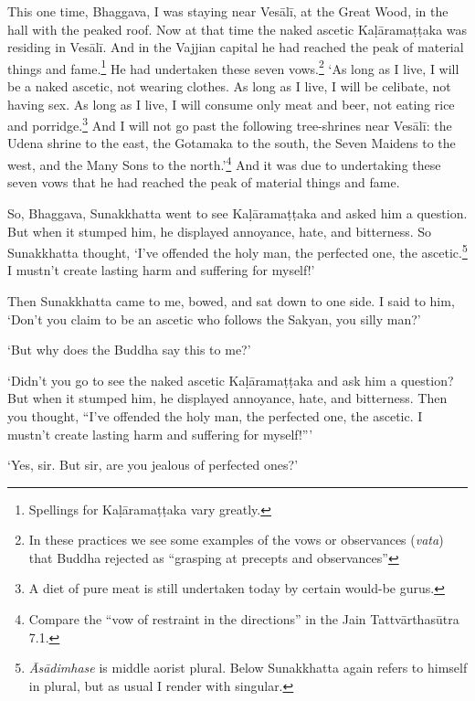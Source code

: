 \documentclass[12pt,openany]{book}%
\begin{document}
This one time, Bhaggava, I was staying near \textsanskrit{Vesālī}, at the Great Wood, in the hall with the peaked roof. Now at that time the naked ascetic \textsanskrit{Kaḷāramaṭṭaka} was residing in \textsanskrit{Vesālī}. And in the Vajjian capital he had reached the peak of material things and fame.\footnote{Spellings for \textsanskrit{Kaḷāramaṭṭaka} vary greatly. } He had undertaken these seven vows.\footnote{In these practices we see some examples of the vows or observances (\textit{vata}) that Buddha rejected as “grasping at precepts and observances” } ‘As long as I live, I will be a naked ascetic, not wearing clothes. As long as I live, I will be celibate, not having sex. As long as I live, I will consume only meat and beer, not eating rice and porridge.\footnote{A diet of pure meat is still undertaken today by certain would-be gurus. } And I will not go past the following tree-shrines near \textsanskrit{Vesālī}: the Udena shrine to the east, the Gotamaka to the south, the Seven Maidens to the west, and the Many Sons to the north.’\footnote{Compare the “vow of restraint in the directions” in the Jain \textsanskrit{Tattvārthasūtra} 7.1. } And it was due to undertaking these seven vows that he had reached the peak of material things and fame. 

So, Bhaggava, Sunakkhatta went to see \textsanskrit{Kaḷāramaṭṭaka} and asked him a question. But when it stumped him, he displayed annoyance, hate, and bitterness. So Sunakkhatta thought, ‘I’ve offended the holy man, the perfected one, the ascetic.\footnote{\textit{\textsanskrit{Āsādimhase}} is middle aorist plural. Below Sunakkhatta again refers to himself in plural, but as usual I render with singular. } I mustn’t create lasting harm and suffering for myself!’ 

Then Sunakkhatta came to me, bowed, and sat down to one side. I said to him, ‘Don’t you claim to be an ascetic who follows the Sakyan, you silly man?’ 

‘But why does the Buddha say this to me?’ 

‘Didn’t you go to see the naked ascetic \textsanskrit{Kaḷāramaṭṭaka} and ask him a question? But when it stumped him, he displayed annoyance, hate, and bitterness. Then you thought, “I’ve offended the holy man, the perfected one, the ascetic. I mustn’t create lasting harm and suffering for myself!”’ 

‘Yes, sir. But sir, are you jealous of perfected ones?’ 
\end{document}
